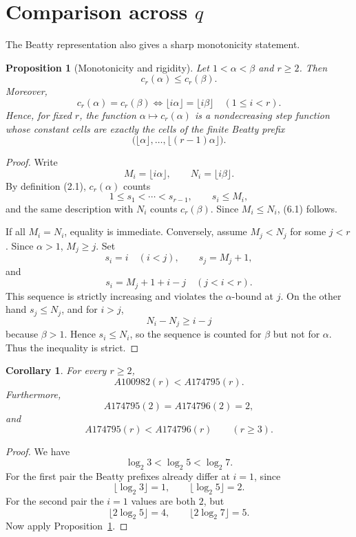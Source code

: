 \documentclass[11pt]{article}
\newtheorem{proposition}[theorem]{Proposition}
\newtheorem{corollary}[theorem]{Corollary}
\begin{document}
\section{Comparison across \texorpdfstring{\(q\)}{q}}
\label{sec:comparison}

The Beatty representation also gives a sharp monotonicity statement.

\begin{proposition}[Monotonicity and rigidity]
\label{prop:monotonicity}
Let \(1<\alpha<\beta\) and \(r\geq2\).  Then
\[
 c_r(\alpha)\leq c_r(\beta).
 \tag{6.1}
\]
Moreover,
\[
 c_r(\alpha)=c_r(\beta)
 \iff
 \lfloor i\alpha\rfloor=\lfloor i\beta\rfloor
 \quad(1\leq i<r).
 \tag{6.2}
\]
Hence, for fixed \(r\), the function
\(\alpha\mapsto c_r(\alpha)\) is a nondecreasing step function whose
constant cells are exactly the cells of the finite Beatty prefix
\[
 \bigl(\lfloor\alpha\rfloor,\ldots,
       \lfloor(r-1)\alpha\rfloor\bigr).
\]
\end{proposition}

\begin{proof}
Write
\[
 M_i=\lfloor i\alpha\rfloor,\qquad
 N_i=\lfloor i\beta\rfloor.
\]
By definition (2.1), \(c_r(\alpha)\) counts
\[
 1\leq s_1<\cdots<s_{r-1},\qquad s_i\leq M_i,
\]
and the same description with \(N_i\) counts \(c_r(\beta)\).
Since \(M_i\leq N_i\), (6.1) follows.

If all \(M_i=N_i\), equality is immediate.  Conversely, assume
\(M_j<N_j\) for some \(j<r\).  Since \(\alpha>1\), \(M_j\geq j\).
Set
\[
 s_i=i\quad(i<j),\qquad
 s_j=M_j+1,
\]
and
\[
 s_i=M_j+1+i-j\quad(j<i<r).
\]
This sequence is strictly increasing and violates the \(\alpha\)-bound at
\(j\).  On the other hand \(s_j\leq N_j\), and for \(i>j\),
\[
 N_i-N_j\geq i-j
\]
because \(\beta>1\).  Hence \(s_i\leq N_i\), so the sequence is counted
for \(\beta\) but not for \(\alpha\).  Thus the inequality is strict.
\end{proof}

\begin{corollary}
\label{cor:three-sequences}
For every \(r\geq2\),
\[
 A100982(r)<A174795(r).
 \tag{6.3}
\]
Furthermore,
\[
 A174795(2)=A174796(2)=2,
\]
and
\[
 A174795(r)<A174796(r)
 \qquad(r\geq3).
 \tag{6.4}
\]
\end{corollary}

\begin{proof}
We have
\[
 \log_2 3<\log_2 5<\log_2 7.
\]
For the first pair the Beatty prefixes already differ at \(i=1\), since
\[
 \lfloor\log_2 3\rfloor=1,\qquad
 \lfloor\log_2 5\rfloor=2.
\]
For the second pair the \(i=1\) values are both \(2\), but
\[
 \lfloor2\log_2 5\rfloor=4,\qquad
 \lfloor2\log_2 7\rfloor=5.
\]
Now apply Proposition~\ref{prop:monotonicity}.
\end{proof}
\end{document}

